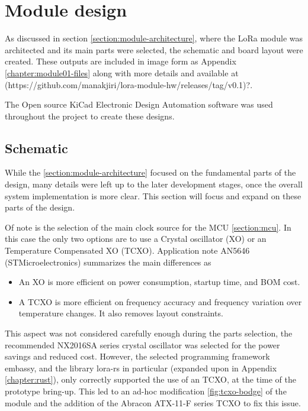 
\section{Module design}
As discussed in section \ref{section:module-architecture}, where the LoRa module was architected and its main parts were selected, the schematic and board layout were created. These outputs are included in image form as Appendix \ref{chapter:module01-files} along with more details and available at (https://github.com/manakjiri/lora-module-hw/releases/tag/v0.1)?.

The Open source KiCad Electronic Design Automation software was used throughout the project to create these designs. 

\subsection{Schematic}
While the \ref{section:module-architecture} focused on the fundamental parts of the design, many details were left up to the later development stages, once the overall system implementation is more clear. This section will focus and expand on these parts of the design.

Of note is the selection of the main clock source for the MCU \ref{section:mcu}. In this case the only two options are to use a Crystal oscillator (XO) or an Temperature Compensated XO (TCXO). Application note AN5646 (STMicroelectronics) summarizes the main differences as
\begin{itemize}
    \item An XO is more efficient on power consumption, startup time, and BOM cost.
    \item A TCXO is more efficient on frequency accuracy and frequency variation over temperature changes. It also
    removes layout constraints.
\end{itemize}

This aspect was not considered carefully enough during the parts selection, the recommended NX2016SA series crystal oscillator was selected for the power savings and reduced cost. However, the selected programming framework embassy, and the library lora-rs in particular (expanded upon in Appendix \ref{chapter:rust}), only correctly supported the use of an TCXO, at the time of the prototype bring-up. This led to an ad-hoc modification \ref{fig:tcxo-bodge} of the module and the addition of the Abracon ATX-11-F series TCXO to fix this issue.

